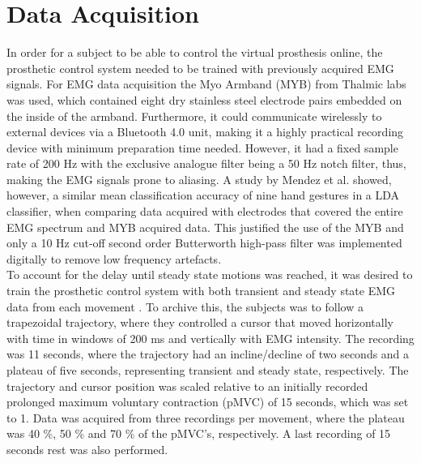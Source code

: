 \section{Data Acquisition}

In order for a subject to be able to control the virtual prosthesis online, the prosthetic control system needed to be trained with previously acquired EMG signals. For EMG data acquisition the Myo Armband (MYB) from Thalmic labs was used, which contained eight dry stainless steel electrode pairs embedded on the inside of the armband. Furthermore, it could communicate wirelessly to external devices via a Bluetooth 4.0 unit, making it a highly practical recording device with minimum preparation time needed. However, it had a fixed sample rate of 200 Hz with the exclusive analogue filter being a 50 Hz notch filter, thus, making the EMG signals prone to aliasing. A study by Mendez et al. \cite{Mendez2017} showed, however, a similar mean classification accuracy of nine hand gestures in a LDA classifier, when comparing data acquired with electrodes that covered the entire EMG spectrum and MYB acquired data. This justified the use of the MYB and only a 10 Hz cut-off second order Butterworth high-pass filter was implemented digitally to remove low frequency artefacts. \\
To account for the delay until steady state motions was reached, it was desired to train the prosthetic control system with both transient and steady state EMG data from each movement \cite{Boschmann2013}. To archive this, the subjects was to follow a trapezoidal trajectory, where they controlled a cursor that moved horizontally with time in windows of 200 ms and vertically with EMG intensity. The recording was 11 seconds, where the trajectory had an incline/decline of two seconds and a plateau of five seconds, representing transient and steady state, respectively. The trajectory and cursor position was scaled relative to an initially recorded prolonged maximum voluntary contraction (pMVC) of 15 seconds, which was set to 1. Data was acquired from three recordings per movement, where the plateau was 40 $\percent$, 50 $\percent$ and 70 $\percent$ of the pMVC's, respectively. A last recording of 15 seconds rest was also performed.

